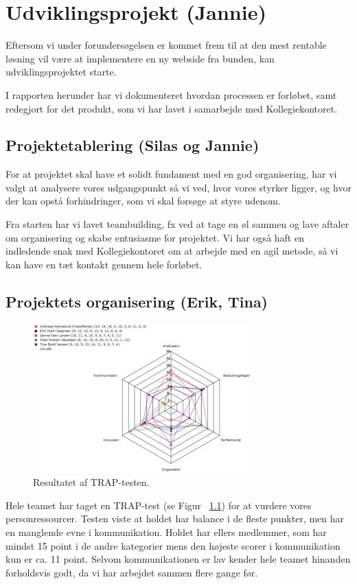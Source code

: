 \documentclass[12pt, a4paper]{report}
\begin{document}
\chapter{Udviklingsprojekt (Jannie)}

Eftersom vi under forundersøgelsen er kommet frem til at den mest rentable løsning vil være at implementere en ny webside fra bunden, kan udviklingsprojektet starte.

I rapporten herunder har vi dokumenteret hvordan processen er forløbet, samt redegjort for det produkt, som vi har lavet i samarbejde med Kollegiekontoret.

\section{Projektetablering (Silas og Jannie)}

For at projektet skal have et solidt fundament med en god organisering, har vi valgt at analysere vores udgangspunkt så vi ved, hvor vores styrker ligger, og hvor der kan opstå forhindringer, som vi skal forsøge at styre udenom.

Fra starten har vi lavet teambuilding, fx ved at tage en øl sammen og lave aftaler om organisering og skabe entusiasme for projektet. Vi har også haft en indledende snak med Kollegiekontoret om at arbejde med en agil metode, så vi kan have en tæt kontakt gennem hele forløbet.

\section{Projektets organisering (Erik, Tina)}
\begin{figure}[ht!]
\centering
\includegraphics[scale=1]{itsaTRAP}
\caption{Resultatet af TRAP-testen.}
\label{trap}
\end{figure}

Hele teamet har taget en TRAP-test (se Figur ~\ref{trap}) for at vurdere vores personressourcer. Testen viste at holdet har balance i de fleste punkter, men har en manglende evne i kommunikation. Holdet har ellers medlemmer, som har mindst 15 point i de andre kategorier mens den højeste scorer i kommunikation kun er ca. 11 point. Selvom kommunikationen er lav kender hele teamet hinanden forholdsvis godt, da vi har arbejdet sammen flere gange før.
\end{document}

